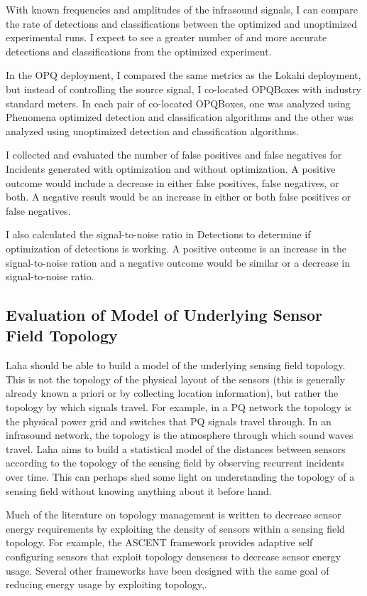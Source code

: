 With known frequencies and amplitudes of the infrasound signals, I can compare the rate of detections and classifications between the optimized and unoptimized experimental runs. I expect to see a greater number of and more accurate detections and classifications from the optimized experiment.

In the OPQ deployment, I compared the same metrics as the Lokahi deployment, but instead of controlling the source signal, I co-located OPQBoxes with industry standard meters. In each pair of co-located OPQBoxes, one was analyzed using Phenomena optimized detection and classification algorithms and the other was analyzed using unoptimized detection and classification algorithms.

I collected and evaluated the number of false positives and false negatives for Incidents generated with optimization and without optimization. A positive outcome would include a decrease in either false positives, false negatives, or both. A negative result would be an increase in either or both false positives or false negatives.

I also calculated the signal-to-noise ratio in Detections to determine if optimization of detections is working. A positive outcome is an increase in the signal-to-noise ration and a negative outcome would be similar or a decrease in signal-to-noise ratio.

\subsection{Evaluation of Model of Underlying Sensor Field Topology}
Laha should be able to build a model of the underlying sensing field topology. This is not the topology of the physical layout of the sensors (this is generally already known a priori or by collecting location information), but rather the topology by which signals travel. For example, in a PQ network the topology is the physical power grid and switches that PQ signals travel through. In an infrasound network, the topology is the atmosphere through which sound waves travel. Laha aims to build a statistical model of the distances between sensors according to the topology of the sensing field by observing recurrent incidents over time. This can perhaps shed some light on understanding the topology of a sensing field without knowing anything about it before hand.

Much of the literature on topology management is written to decrease sensor energy requirements by exploiting the density of sensors within a sensing field topology. For example, the ASCENT\cite{cerpa2004ascent} framework provides adaptive self configuring sensors that exploit topology denseness to decrease sensor energy usage. Several other frameworks have been designed with the same goal of reducing energy usage by exploiting topology\cite{schurgers2002stem},\cite{schurgers2002topology}.

